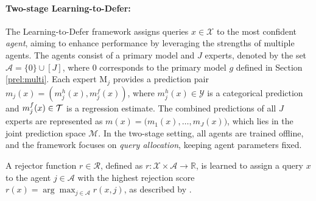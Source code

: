 \paragraph{Two-stage Learning-to-Defer:} 
The Learning-to-Defer framework assigns queries \( x \in \mathcal{X} \) to the most confident \textit{agent}, aiming to enhance performance by leveraging the strengths of multiple agents. The agents consist of a primary model and \( J \) experts, denoted by the set \( \mathcal{A} = \{0\} \cup [J] \), where \( 0 \) corresponds to the primary model \( g \) defined in Section \ref{prel:multi}. Each expert \( \text{M}_j \) provides a prediction pair \( m_j(x) = (m_j^h(x), m_j^f(x)) \), where \( m_j^h(x) \in \mathcal{Y} \) is a categorical prediction and \( m_j^f(x) \in \mathcal{T} \) is a regression estimate. The combined predictions of all \( J \) experts are represented as \( m(x) = \big(m_1(x), \dots, m_J(x)\big) \), which lies in the joint prediction space \( \mathcal{M} \). In the two-stage setting, all agents are trained offline, and the framework focuses on \textit{query allocation}, keeping agent parameters fixed.

A rejector function \( r \in \mathcal{R} \), defined as \( r: \mathcal{X} \times \mathcal{A} \to \mathbb{R} \), is learned to assign a query \( x \) to the agent \( j \in \mathcal{A} \) with the highest rejection score \( r(x) = \arg\max_{j \in \mathcal{A}} r(x, j) \), as described by \citet{mao2024regressionmultiexpertdeferral, mao2023twostage, montreuil2024twostagelearningtodefermultitasklearning}.

